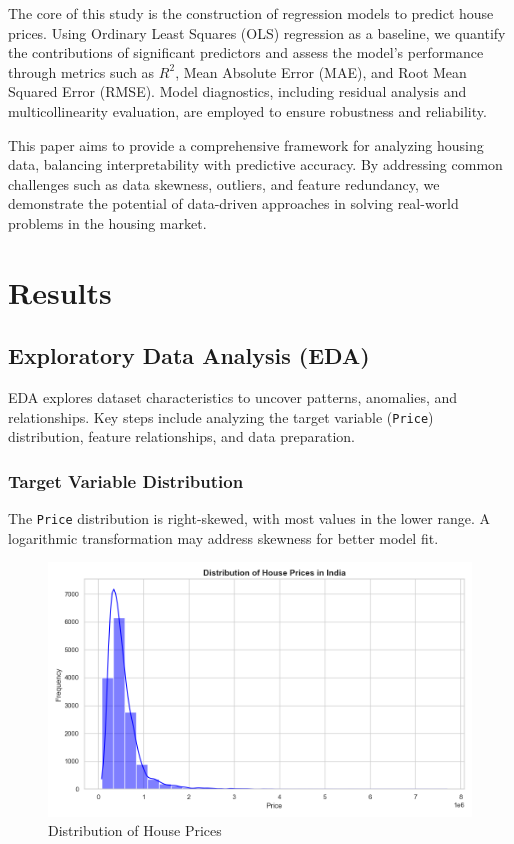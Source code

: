 \documentclass[11pt]{article}
\begin{document}
The core of this study is the construction of regression models to predict house prices. Using Ordinary Least Squares (OLS) regression as a baseline, we quantify the contributions of significant predictors and assess the model's performance through metrics such as \(R^2\), Mean Absolute Error (MAE), and Root Mean Squared Error (RMSE). Model diagnostics, including residual analysis and multicollinearity evaluation, are employed to ensure robustness and reliability.

This paper aims to provide a comprehensive framework for analyzing housing data, balancing interpretability with predictive accuracy. By addressing common challenges such as data skewness, outliers, and feature redundancy, we demonstrate the potential of data-driven approaches in solving real-world problems in the housing market.




\section{Results}

\subsection{Exploratory Data Analysis (EDA)}

EDA explores dataset characteristics to uncover patterns, anomalies, and relationships. Key steps include analyzing the target variable (\texttt{Price}) distribution, feature relationships, and data preparation.

\subsubsection{Target Variable Distribution}
The \texttt{Price} distribution is right-skewed, with most values in the lower range. A logarithmic transformation may address skewness for better model fit.

\begin{figure}[htbp]
    \centering
    \includegraphics[width=\linewidth]{results/figures/price_distribution.png}
    \caption{Distribution of House Prices}
    \label{fig:price_distribution}
\end{figure}
\end{document}
